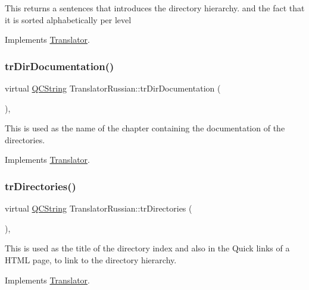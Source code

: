 This returns a sentences that introduces the directory hierarchy. and the fact that it is sorted alphabetically per level 

Implements \mbox{\hyperlink{class_translator}{Translator}}.

\mbox{\label{class_translator_russian_aee98c57fd28976738228f86153b5406a}} 
\subsubsection{\texorpdfstring{trDirDocumentation()}{trDirDocumentation()}}
{\footnotesize\ttfamily virtual \mbox{\hyperlink{class_q_c_string}{Q\+C\+String}} Translator\+Russian\+::tr\+Dir\+Documentation (\begin{DoxyParamCaption}{ }\end{DoxyParamCaption})\hspace{0.3cm}{\ttfamily [inline]}, {\ttfamily [virtual]}}

This is used as the name of the chapter containing the documentation of the directories. 

Implements \mbox{\hyperlink{class_translator}{Translator}}.

\mbox{\label{class_translator_russian_a44a62c14e6ba355a25a6c8b2c3d25b9e}} 
\subsubsection{\texorpdfstring{trDirectories()}{trDirectories()}}
{\footnotesize\ttfamily virtual \mbox{\hyperlink{class_q_c_string}{Q\+C\+String}} Translator\+Russian\+::tr\+Directories (\begin{DoxyParamCaption}{ }\end{DoxyParamCaption})\hspace{0.3cm}{\ttfamily [inline]}, {\ttfamily [virtual]}}

This is used as the title of the directory index and also in the Quick links of a H\+T\+ML page, to link to the directory hierarchy. 

Implements \mbox{\hyperlink{class_translator}{Translator}}.

